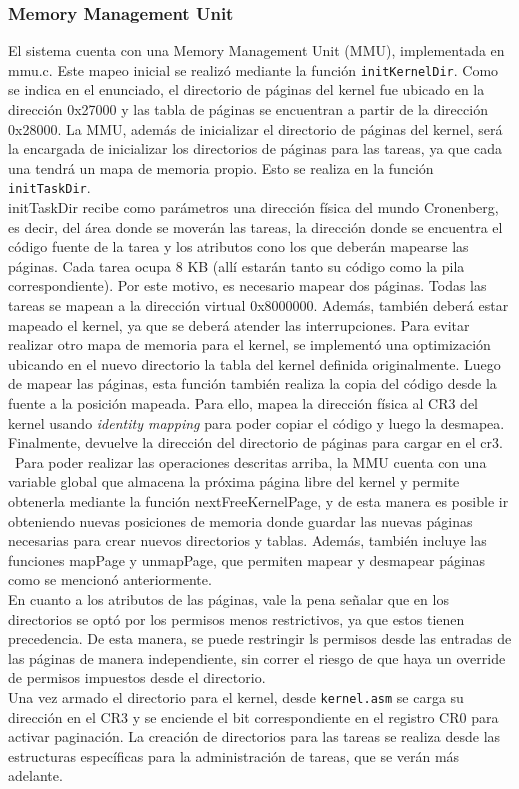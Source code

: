\documentclass[a4paper]{article}
\begin{document}
\subsubsection{Memory Management Unit}
El sistema cuenta con una Memory Management Unit (MMU), implementada en mmu.c. Este mapeo inicial se realizó mediante la función {\tt initKernelDir}. Como se indica en el enunciado, el directorio de páginas del kernel fue ubicado en la dirección 0x27000 y las tabla de páginas se encuentran a partir de la dirección 0x28000.
La MMU, además de inicializar el directorio de páginas del kernel, será la encargada de inicializar los directorios de páginas para las tareas, ya que cada una tendrá un mapa de memoria propio. Esto se realiza en la función {\tt initTaskDir}. \\
initTaskDir recibe como parámetros una dirección física del mundo Cronenberg, es decir, del área donde se moverán las tareas, la dirección donde se encuentra el código fuente de la tarea y los atributos cono los que deberán mapearse las páginas. Cada tarea ocupa 8 KB (allí estarán tanto su código como la pila correspondiente). Por este motivo, es necesario mapear dos páginas. Todas las tareas se mapean a la dirección virtual 0x8000000. Además, también deberá estar mapeado el kernel, ya que se deberá atender las interrupciones. Para evitar realizar otro mapa de memoria para el kernel, se implementó una optimización ubicando en el nuevo directorio la tabla del kernel definida originalmente. Luego de mapear las páginas, esta función también realiza la copia del código desde la fuente a la posición mapeada. Para ello, mapea la dirección física al CR3 del kernel usando \textit{identity mapping} para poder copiar el código y luego la desmapea. Finalmente, devuelve la dirección del directorio de páginas para cargar en el cr3. \
Para poder realizar las operaciones descritas arriba, la MMU cuenta con una variable global que almacena la próxima página libre del kernel y permite obtenerla mediante la función nextFreeKernelPage, y de esta manera es posible ir obteniendo nuevas posiciones de memoria donde guardar las nuevas páginas necesarias para crear nuevos directorios y tablas. Además, también incluye las funciones mapPage y unmapPage, que permiten mapear y desmapear páginas como se mencionó anteriormente. \\
En cuanto a los atributos de las páginas, vale la pena señalar que en los directorios se optó por los permisos menos restrictivos, ya que estos tienen precedencia. De esta manera, se puede restringir ls permisos desde las entradas de las páginas de manera independiente, sin correr el riesgo de que haya un override de permisos impuestos desde el directorio. \\
Una vez armado el directorio para el kernel, desde {\tt kernel.asm} se carga su dirección en el CR3 y se enciende el bit correspondiente en el registro CR0 para activar paginación. La creación de directorios para las tareas se realiza desde las estructuras específicas para la administración de tareas, que se verán más adelante.
\end{document}
